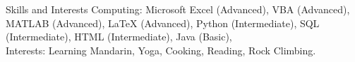 \documentclass{resume} %
\begin{document}
\fi
\begin{rSection}{Skills and Interests}
Computing: Microsoft Excel (Advanced), VBA (Advanced), MATLAB (Advanced), LaTeX (Advanced), Python (Intermediate), SQL (Intermediate), HTML (Intermediate), Java (Basic), \\
Interests: Learning Mandarin, Yoga, Cooking, Reading, Rock Climbing. \\


\end{rSection}




\end{document}
